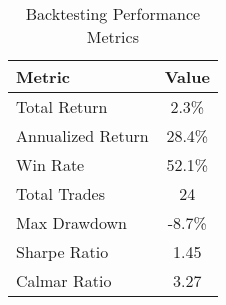 
\begin{table}[ht]
\centering
\caption{Backtesting Performance Metrics}
\label{tab:performance}
\begin{tabular}{@{}l@{\hskip 1cm}c@{}}
\toprule
Metric & Value \\
\midrule
Total Return & 2.3\% \\
Annualized Return & 28.4\% \\
Win Rate & 52.1\% \\
Total Trades & 24 \\
Max Drawdown & -8.7\% \\
Sharpe Ratio & 1.45 \\
Calmar Ratio & 3.27 \\
\bottomrule
\end{tabular}
\end{table}
